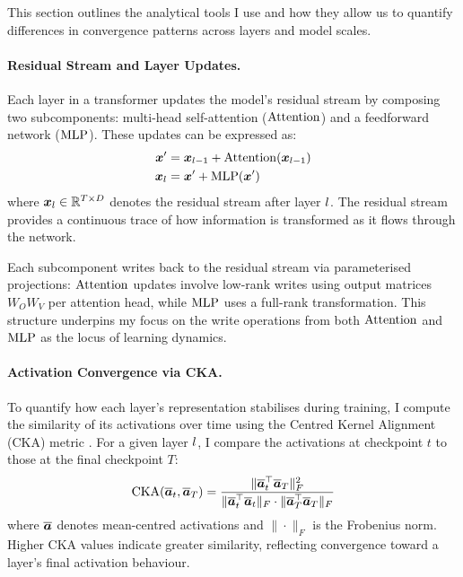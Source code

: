 This section outlines the analytical tools I use and how they allow us to quantify differences in convergence patterns across layers and model scales.

\paragraph{Residual Stream and Layer Updates.}
Each layer in a transformer updates the model's residual stream by composing two subcomponents: multi-head self-attention ($\mathrm{Attention}$) and a feedforward network ($\mathrm{MLP}$). These updates can be expressed as:
\begin{align}
    \boldsymbol{x}' &= \boldsymbol{x}_{l-1} + \mathrm{Attention}(\boldsymbol{x}_{l-1}) \\
    \boldsymbol{x}_{l} &= \boldsymbol{x}' + \mathrm{MLP}(\boldsymbol{x}')
\end{align}
where $\boldsymbol{x}_{l} \in \mathbb{R}^{T \times D}$ denotes the residual stream after layer $l$. The residual stream provides a continuous trace of how information is transformed as it flows through the network.

Each subcomponent writes back to the residual stream via parameterised projections: $\mathrm{Attention}$ updates involve low-rank writes using output matrices $W_O W_V$ per attention head, while $\mathrm{MLP}$ uses a full-rank transformation. This structure underpins my focus on the write operations from both $\mathrm{Attention}$ and $\mathrm{MLP}$ as the locus of learning dynamics.

\paragraph{Activation Convergence via CKA.}
To quantify how each layer's representation stabilises during training, I compute the similarity of its activations over time using the Centred Kernel Alignment (CKA) metric \citep{kornblith2019cka}. For a given layer $l$, I compare the activations at checkpoint $t$ to those at the final checkpoint $T$:
\begin{align}
    \mathrm{CKA}(\overline{\boldsymbol{a}}_{t}, \overline{\boldsymbol{a}}_{T}) = 
    \frac{\|\overline{\boldsymbol{a}}_{t}^{\top} \overline{\boldsymbol{a}}_{T}\|_F^2}
         {\|\overline{\boldsymbol{a}}_{t}^{\top} \overline{\boldsymbol{a}}_{t}\|_F \cdot \|\overline{\boldsymbol{a}}_{T}^{\top} \overline{\boldsymbol{a}}_{T}\|_F}
\end{align}
where $\overline{\boldsymbol{a}}$ denotes mean-centred activations and $\|\cdot\|_F$ is the Frobenius norm. Higher CKA values indicate greater similarity, reflecting convergence toward a layer's final activation behaviour.

